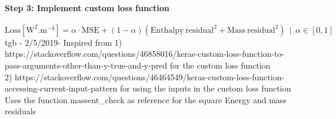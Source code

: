 \documentclass[11pt]{article}
\begin{document}
    \hypertarget{step-3-implement-custom-loss-function}{%
\paragraph{Step 3: Implement custom loss
function}\label{step-3-implement-custom-loss-function}}

\[
\mathrm{Loss}\left[\mathrm{W^{2}.m^{-4}}\right]=\alpha\cdot\mathrm{MSE}+\left(1-\alpha\right)\left(\mathrm{Enthalpy\ residual}^{2}+\mathrm{Mass\ residual}^{2}\right)\ \ |\ \ \alpha\in[0,1]
\] tgb - 2/5/2019- Inspired from 1)
https://stackoverflow.com/questions/46858016/keras-custom-loss-function-to-pass-arguments-other-than-y-true-and-y-pred
for the custom loss function\\
2)
https://stackoverflow.com/questions/46464549/keras-custom-loss-function-accessing-current-input-pattern
for using the inputs in the custom loss function Uses the function
massent\_check as reference for the square Energy and mass residuals
\end{document}
